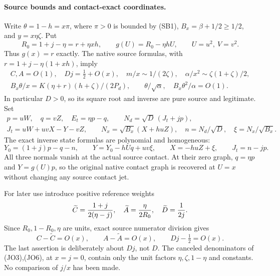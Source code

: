 \paragraph{Source bounds and contact-exact coordinates.}
Write $\theta=1-h=x\pi$, where $\pi>0$ is bounded by (SB1),
$B_x=\beta+1/2\ge1/2$, and $y=x\eta\zeta$. Put
\[
 R_0=1+j-\eta=r+\eta xh,\qquad
 g(U)=R_0-\eta hU,\qquad U=u^2,\ V=v^2.
                                                               \tag{JO2}
\]
Thus $g(x)=r$ exactly. The native source formulas, with
$r=1+j-\eta(1+xh)$, imply
\[
 \begin{gathered}
 C,A=O(1),\quad Dj=\tfrac12+O(x),\quad
 m/x\sim1/(2\zeta),\quad
 \alpha/x^2\sim\zeta(1+\zeta)/2,\\
 B_x\theta/x=K(\eta+r)(h+\zeta)/(2P_d),\qquad
 \theta/\sqrt\alpha,\quad B_x\theta^2/\alpha=O(1).
 \end{gathered}                                                \tag{JO3}
\]
In particular $D>0$, so its square root and inverse are pure source
and legitimate. Set
\[
 \begin{gathered}
 p=uW,\quad q=vZ,\quad E_t=\eta p-q,\qquad
 N_d=\sqrt D\,(J_t+jp),\\
 J_t=uW+uvX-Y-vZ,\qquad
 N_x=\sqrt{B_x}(X+huZ),\quad
 n=N_d/\sqrt D,\quad \xi=N_x/\sqrt{B_x}.
 \end{gathered}                                                \tag{JO4}
\]
The exact inverse state formulas are polynomial and homogeneous:
\[
 Y_0=(1+j)p-q-n,\qquad
 Y=Y_0-hUq+uv\xi,\qquad X=-huZ+\xi,\qquad
 J_t=n-jp.                                             \tag{JO5}
\]
All three normals vanish at the actual source contact. At their zero
graph, $q=\eta p$ and $Y=g(U)p$, so the original native contact
graph is recovered at $U=x$ without changing any source contact jet.

For later use introduce positive reference weights
\[
 \widetilde C={1+j\over2(\eta-j)},\quad
 \widetilde A={\eta\over2R_0},\quad
 \widetilde D={1\over2j}.
\]
Since $R_0,1-R_0,\eta$ are units, exact source numerator division gives
\[
 C-\widetilde C=O(x),\qquad A-\widetilde A=O(x),\qquad
 Dj-\tfrac12=O(x).                                    \tag{JO6}
\]
The last assertion is deliberately about $Dj$, not $D$. The canceled
denominators of (JO3),(JO6), at $x=j=0$, contain only the unit
factors $\eta,\zeta,1-\eta$ and constants. No comparison of $j/x$
has been made.

